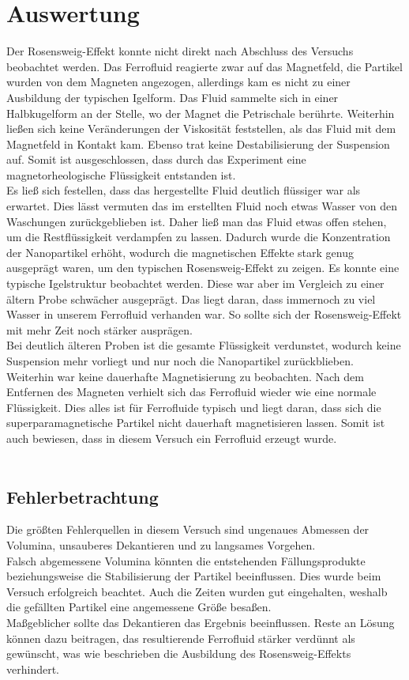 \documentclass[a4paper]{TUBAFprotokoll}
\begin{document}
		\section{Auswertung}
		Der Rosensweig-Effekt konnte nicht direkt nach Abschluss des Versuchs beobachtet werden. Das Ferrofluid reagierte zwar auf das Magnetfeld, die Partikel wurden von dem Magneten angezogen, allerdings kam es nicht zu einer Ausbildung der typischen Igelform. Das Fluid sammelte sich in einer Halbkugelform an der Stelle, wo der Magnet die Petrischale berührte. Weiterhin ließen sich keine Veränderungen der Viskosität feststellen, als das Fluid mit dem Magnetfeld in Kontakt kam. Ebenso trat keine Destabilisierung der Suspension auf. Somit ist ausgeschlossen, dass durch das Experiment eine magnetorheologische Flüssigkeit entstanden ist.\\
	Es ließ sich festellen, dass das hergestellte Fluid deutlich flüssiger war als erwartet. Dies lässt vermuten das im erstellten Fluid noch etwas Wasser von den Waschungen zurückgeblieben ist. Daher ließ man das Fluid etwas offen stehen, um die Restflüssigkeit verdampfen zu lassen. Dadurch wurde die Konzentration der Nanopartikel erhöht, wodurch die magnetischen Effekte stark genug ausgeprägt waren, um den typischen Rosensweig-Effekt zu zeigen. Es konnte eine typische Igelstruktur beobachtet werden. Diese war aber im Vergleich zu einer ältern Probe schwächer ausgeprägt. Das liegt daran, dass immernoch zu viel Wasser in unserem Ferrofluid verhanden war. So sollte sich der Rosensweig-Effekt mit mehr Zeit noch stärker ausprägen.\\
		Bei deutlich älteren Proben ist die gesamte Flüssigkeit verdunstet, wodurch keine Suspension mehr vorliegt und nur noch die Nanopartikel zurückblieben.\\
		Weiterhin war keine dauerhafte Magnetisierung zu beobachten. Nach dem Entfernen des Magneten verhielt sich das Ferrofluid wieder wie eine normale Flüssigkeit. Dies alles ist für Ferrofluide typisch und liegt daran, dass sich die superparamagnetische Partikel nicht dauerhaft magnetisieren lassen. Somit ist auch bewiesen, dass in diesem Versuch ein Ferrofluid erzeugt wurde.\\
		\\
		\subsection{Fehlerbetrachtung}
		Die größten Fehlerquellen in diesem Versuch sind ungenaues Abmessen der Volumina, unsauberes Dekantieren und zu langsames Vorgehen. \\
Falsch abgemessene Volumina könnten die entstehenden Fällungsprodukte beziehungsweise die Stabilisierung der Partikel beeinflussen. Dies wurde beim Versuch 			erfolgreich beachtet. Auch die Zeiten wurden gut eingehalten, weshalb die gefällten Partikel eine angemessene Größe besaßen. \\
Maßgeblicher sollte das Dekantieren das Ergebnis beeinflussen. Reste an Lösung können dazu beitragen, das resultierende Ferrofluid stärker verdünnt als gewünscht, was wie beschrieben die Ausbildung des Rosensweig-Effekts verhindert.

	
\end{document}
